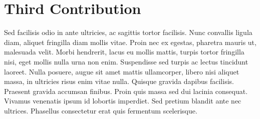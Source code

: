 \chapter{Third Contribution\label{chap:Contribution3}}

Sed facilisis odio in ante ultricies, ac sagittis tortor facilisis. Nunc convallis ligula diam, aliquet fringilla diam mollis vitae. Proin nec ex egestas, pharetra mauris ut, malesuada velit. Morbi hendrerit, lacus eu mollis mattis, turpis tortor fringilla nisi, eget mollis nulla urna non enim. Suspendisse sed turpis ac lectus tincidunt laoreet. Nulla posuere, augue sit amet mattis ullamcorper, libero nisi aliquet massa, in ultricies risus enim vitae nulla. Quisque gravida dapibus facilisis. Praesent gravida accumsan finibus. Proin quis massa sed dui lacinia consequat. Vivamus venenatis ipsum id lobortis imperdiet. Sed pretium blandit ante nec ultrices. Phasellus consectetur erat quis fermentum scelerisque.